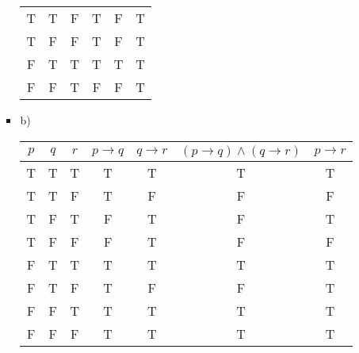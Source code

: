 \documentclass[10pt,a4paper]{article}
\begin{document}
\begin{itemize}
\begin{itemize}
\begin{itemize}
\begin{tabular}{|c|c||c|c|c|c|}
        T & T & F & T & F & T \\
        T & F & F & T & F & T \\
        F & T & T & T & T & T \\
        F & F & T & F & F & T \\ \hline
      \end{tabular}
      \item b)
      \begin{tabular}{|c|c|c||c|c|c|c|}
        \hline
        $p$ 
        &$q$ 
        &$r$ 
        &$p\to q$ 
        &$q\to r$ 
        &$(p\to q)\land (q\to r)$
        &$p\to r$\\ \hline
        T & T & T & T & T & T & T\\
        T & T & F & T & F & F & F\\
        T & F & T & F & T & F & T\\
        T & F & F & F & T & F & F\\ \hline
        F & T & T & T & T & T & T\\
        F & T & F & T & F & F & T\\
        F & F & T & T & T & T & T\\
        F & F & F & T & T & T & T\\ \hline
      \end{tabular}
      

\end{itemize}
\end{itemize}
\end{itemize}
\end{document}
